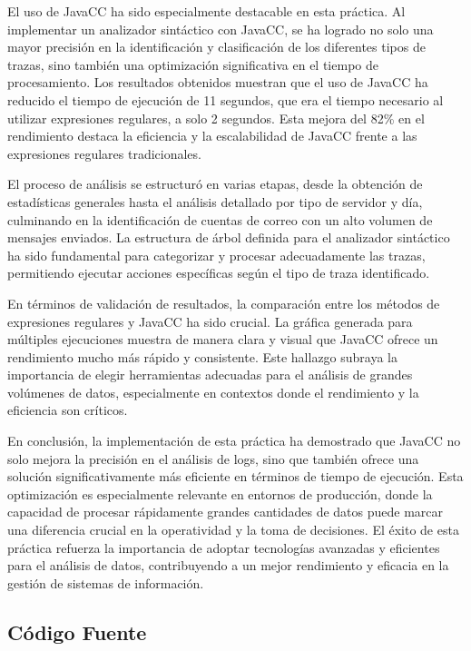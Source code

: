 El uso de JavaCC ha sido especialmente destacable en esta práctica. Al implementar un analizador sintáctico con JavaCC, se ha logrado no solo una mayor precisión en la identificación y clasificación de los diferentes tipos de trazas, sino también una optimización significativa en el tiempo de procesamiento. Los resultados obtenidos muestran que el uso de JavaCC ha reducido el tiempo de ejecución de 11 segundos, que era el tiempo necesario al utilizar expresiones regulares, a solo 2 segundos. Esta mejora del 82\% en el rendimiento destaca la eficiencia y la escalabilidad de JavaCC frente a las expresiones regulares tradicionales.

El proceso de análisis se estructuró en varias etapas, desde la obtención de estadísticas generales hasta el análisis detallado por tipo de servidor y día, culminando en la identificación de cuentas de correo con un alto volumen de mensajes enviados. La estructura de árbol definida para el analizador sintáctico ha sido fundamental para categorizar y procesar adecuadamente las trazas, permitiendo ejecutar acciones específicas según el tipo de traza identificado.

En términos de validación de resultados, la comparación entre los métodos de expresiones regulares y JavaCC ha sido crucial. La gráfica generada para múltiples ejecuciones muestra de manera clara y visual que JavaCC ofrece un rendimiento mucho más rápido y consistente. Este hallazgo subraya la importancia de elegir herramientas adecuadas para el análisis de grandes volúmenes de datos, especialmente en contextos donde el rendimiento y la eficiencia son críticos.

En conclusión, la implementación de esta práctica ha demostrado que JavaCC no solo mejora la precisión en el análisis de logs, sino que también ofrece una solución significativamente más eficiente en términos de tiempo de ejecución. Esta optimización es especialmente relevante en entornos de producción, donde la capacidad de procesar rápidamente grandes cantidades de datos puede marcar una diferencia crucial en la operatividad y la toma de decisiones. El éxito de esta práctica refuerza la importancia de adoptar tecnologías avanzadas y eficientes para el análisis de datos, contribuyendo a un mejor rendimiento y eficacia en la gestión de sistemas de información.

\subsection{Código Fuente}

